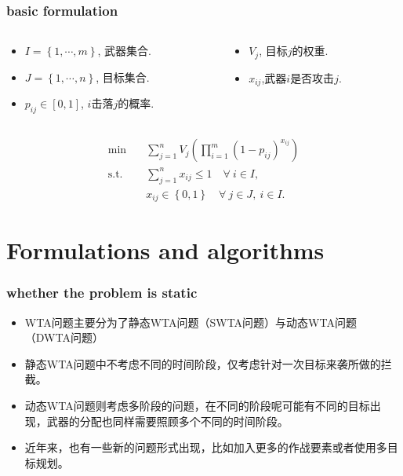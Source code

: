 \documentclass[CJK,10pt]{beamer}
\begin{document}
\begin{frame}
    \frametitle{basic formulation}
    \begin{columns}
        \begin{column}{.70\linewidth}
            \footnotesize
            \begin{itemize}
                \item $I = \left\{1,\cdots,m\right\} $, 武器集合.
                \item $J = \left\{1,\cdots,n\right\} $, 目标集合.
                \item $p_{ij}\in [0,1]$, $i$击落$j$的概率.
            \end{itemize}
        \end{column}
    \hspace{-1cm}
        \begin{column}{.35\linewidth}
            \footnotesize
            \begin{itemize}
                \item $V_j$, 目标$j$的权重.
                \item $x_{ij}$,武器$i$是否攻击$j$.
            \end{itemize}
        \end{column}
    \end{columns}
    
    \begin{align}
        \min\quad & \sum_{j=1}^n V_j \left( \prod_{i=1}^m (1 -  p_{ij})^{x_{ij}} \right) \\ 
        \mathrm{s. t.}\quad &\sum_{j=1}^n x_{ij} \leq 1\quad \forall ~i \in I,\\
        & x_{ij} \in \left\{ 0,1 \right\} \quad \forall~ j\in J , ~ i \in I.
    \end{align}
\end{frame}



\section{Formulations and algorithms}

\begin{frame}
    \frametitle{whether the problem is static}
    \begin{itemize}
        \item WTA问题主要分为了静态WTA问题（SWTA问题）与动态WTA问题（DWTA问题）
        \item 静态WTA问题中不考虑不同的时间阶段，仅考虑针对一次目标来袭所做的拦截。
        \item 动态WTA问题则考虑多阶段的问题，在不同的阶段呢可能有不同的目标出现，武器的分配也同样需要照顾多个不同的时间阶段。
        \item 近年来，也有一些新的问题形式出现，比如加入更多的作战要素或者使用多目标规划。
    \end{itemize}
\end{frame}
\end{document}

